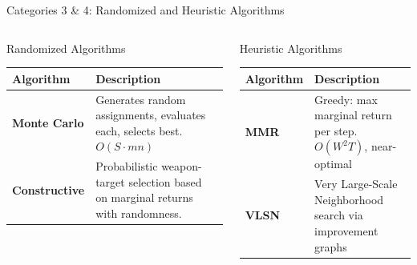 \documentclass[aspectratio=43,8pt]{beamer}
\begin{document}
\begin{frame}{Categories 3 \& 4: Randomized and Heuristic Algorithms}
\begin{columns}[t]
\begin{block}{Randomized Algorithms}
\small
\begin{tabular}{p{1.5cm}p{2.8cm}}
\toprule
\textbf{Algorithm} & \textbf{Description} \\
\midrule
\textbf{Monte Carlo} & Generates random assignments, evaluates each, selects best. $O(S \cdot mn)$ \\
\addlinespace
\textbf{Constructive} & Probabilistic weapon-target selection based on marginal returns with randomness. \\
\bottomrule
\end{tabular}
\end{block}

\begin{alertblock}{Heuristic Algorithms}
\small
\begin{tabular}{p{1.5cm}p{2.8cm}}
\toprule
\textbf{Algorithm} & \textbf{Description} \\
\midrule
\textbf{MMR} & Greedy: max marginal return per step. $O(W^2T)$, near-optimal \cite{intechopen2020} \\
\addlinespace
\textbf{VLSN} & Very Large-Scale Neighborhood search via improvement graphs \cite{ahuja2007} \\
\bottomrule
\end{tabular}
\end{alertblock}
\end{columns}
\end{frame}
\end{document}
